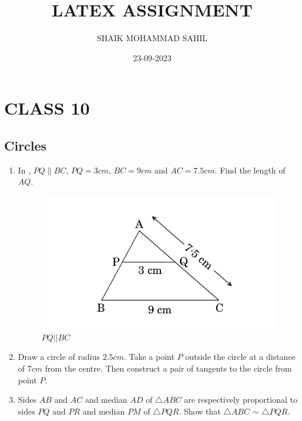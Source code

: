 \documentclass{article}
\theoremstyle{remark}
\begin{document}
\title{LATEX ASSIGNMENT}
\author{SHAIK MOHAMMAD SAHIL}
\date{23-09-2023}
\maketitle
\section*{CLASS 10} 
\subsection*{Circles}
\date{}
\maketitle
\begin{enumerate}[label=\arabic*.,ref=\theenumi]
    \item In , $PQ\parallel BC$, $PQ=3cm$, $BC=9cm$  and $AC=7.5cm$. Find the length of $AQ$.
    \begin{figure}[H]
        \centering
        \includegraphics[width=\columnwidth]{./figs/figure1.png}
        \caption{$PQ\left |  \right | BC$}
        \label{fig:fig1.png}
    \end{figure}

    \item Draw a circle of radius $2.5cm$. Take a point $P$ outside the circle at a distance of $7cm$ from the centre. Then construct a pair of tangents to the circle from point $P$.

    \item Sides $AB$ and $AC$ and median $AD$ of $\triangle ABC$ are respectively proportional to sides $PQ$ and $PR$ and median $PM$ of $\triangle PQR$. Show that $\triangle ABC$  $\sim$  $\triangle PQR$.


\end{enumerate}
\end{document}
